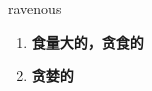 
\begin{frame}
{\huge ravenous}
\begin{center}
\begin{enumerate}\Large
  \item \textbf{食量大的，贪食的}
  \item \textbf{贪婪的}
\end{enumerate}
\end{center}
\end{frame}
